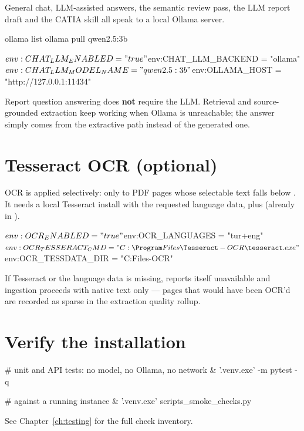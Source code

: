 General chat, LLM-assisted answers, the semantic review pass, the LLM report
draft and the CATIA skill all speak to a local Ollama server.

\begin{shellblock}
ollama list
ollama pull qwen2.5:3b
\end{shellblock}

\begin{shellblock}
$env:CHAT_LLM_ENABLED = "true"
$env:CHAT_LLM_BACKEND = "ollama"
$env:CHAT_LLM_MODEL_NAME = "qwen2.5:3b"
$env:OLLAMA_HOST = "http://127.0.0.1:11434"
\end{shellblock}

Report question answering does \textbf{not} require the LLM. Retrieval and
source-grounded extraction keep working when Ollama is unreachable; the answer
simply comes from the extractive path instead of the generated one.

\section{Tesseract OCR (optional)}

OCR is applied selectively: only to PDF pages whose selectable text falls below
. It needs a local Tesseract install with the
requested language data, plus  (already in
).

\begin{shellblock}
$env:OCR_ENABLED = "true"
$env:OCR_LANGUAGES = "tur+eng"
$env:OCR_TESSERACT_CMD = "C:\Program Files\Tesseract-OCR\tesseract.exe"
$env:OCR_TESSDATA_DIR = "C:\Program Files\Tesseract-OCR\tessdata"
\end{shellblock}

If Tesseract or the language data is missing,  reports
itself unavailable and ingestion proceeds with native text only --- pages that
would have been OCR'd are recorded as sparse in the extraction quality rollup.

\section{Verify the installation}

\begin{shellblock}
# unit and API tests: no model, no Ollama, no network
& '.venv\Scripts\python.exe' -m pytest -q

# against a running instance
& '.venv\Scripts\python.exe' scripts\run_smoke_checks.py
\end{shellblock}

See Chapter~\ref{ch:testing} for the full check inventory.
